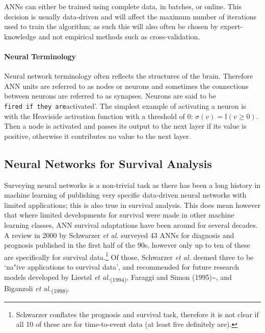 \documentclass[
  letterpaper,
]{scrbook}
\let\oldparagraph\paragraph
\renewcommand{\paragraph}[1]{\oldparagraph{#1}\mbox{}}
\theoremstyle{plain}
\theoremstyle{definition}
\theoremstyle{remark}
\begin{document}
ANNs can either be trained using complete data, in batches, or online.
This decision is usually data-driven and will affect the maximum number
of iterations used to train the algorithm; as such this will also often
be chosen by expert-knowledge and not empirical methods such as
cross-validation.

\paragraph{Neural Terminology}

Neural network terminology often reflects the structures of the brain.
Therefore ANN units are referred to as nodes or neurons and sometimes
the connections between neurons are referred to as synapses. Neurons are
said to be \texttt{fired\textquotesingle{}\ if\ they\ are}activated'.
The simplest example of activating a neuron is with the Heaviside
activation function with a threshold of \(0\):
\(\sigma(v) = \mathbb{I}(v \geq 0)\). Then a node is activated and
passes its output to the next layer if its value is positive, otherwise
it contributes no value to the next layer.

\subsection{Neural Networks for Survival Analysis}

Surveying neural networks is a non-trivial task as there has been a long
history in machine learning of publishing very specific data-driven
neural networks with limited applications; this is also true in survival
analysis. This does mean however that where limited developments for
survival were made in other machine learning classes, ANN survival
adaptations have been around for several decades. A review in 2000 by
Schwarzer \textit{et al.}{} surveyed 43 ANNs for diagnosis and prognosis
published in the first half of the 90s, however only up to ten of these
are specifically for survival
data.\footnote{Schwarzer conflates the prognosis and survival task, therefore it is not clear if all 10 of these are for time-to-event data (at least five definitely are).}
Of those, Schwarzer \textit{et al.}{} deemed three to be `na"ive
applications to survival data', and recommended for future research
models developed by Liest\o l
\textit{et al.}\textsubscript{(1994)}\cite{Liestol1994}, Faraggi and
Simon (1995)\textasciitilde{}\cite{Faraggi1995}, and Biganzoli
\textit{et al.}\textsubscript{(1998)}\cite{Biganzoli1998}.
\end{document}
